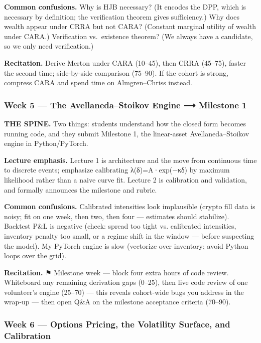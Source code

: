 \documentclass[
]{article}
\begin{document}
\textbf{Common confusions.} Why is HJB necessary? (It encodes the DPP,
which is necessary by definition; the verification theorem gives
sufficiency.) Why does wealth appear under CRRA but not CARA? (Constant
marginal utility of wealth under CARA.) Verification vs.~existence
theorem? (We always have a candidate, so we only need verification.)

\textbf{Recitation.} Derive Merton under CARA (10--45), then CRRA
(45--75), faster the second time; side-by-side comparison (75--90). If
the cohort is strong, compress CARA and spend time on Almgren--Chriss
instead.

\subsubsection{Week 5 --- The Avellaneda--Stoikov Engine ⟶ Milestone
1}\label{week-5-the-avellanedastoikov-engine-milestone-1}

\textbf{THE SPINE.} Two things: students understand how the closed form
becomes running code, and they submit Milestone 1, the linear-asset
Avellaneda--Stoikov engine in Python/PyTorch.

\textbf{Lecture emphasis.} Lecture 1 is architecture and the move from
continuous time to discrete events; emphasize calibrating
λ(δ)=A·exp(−κδ) by maximum likelihood rather than a naive curve fit.
Lecture 2 is calibration and validation, and formally announces the
milestone and rubric.

\textbf{Common confusions.} Calibrated intensities look implausible
(crypto fill data is noisy; fit on one week, then two, then four ---
estimates should stabilize). Backtest P\&L is negative (check: spread
too tight vs. calibrated intensities, inventory penalty too small, or a
regime shift in the window --- before suspecting the model). My PyTorch
engine is slow (vectorize over inventory; avoid Python loops over the
grid).

\textbf{Recitation.} ⚑ Milestone week --- block four extra hours of code
review. Whiteboard any remaining derivation gaps (0--25), then live code
review of one volunteer's engine (25--70) --- this reveals cohort-wide
bugs you address in the wrap-up --- then open Q\&A on the milestone
acceptance criteria (70--90).

\subsubsection{Week 6 --- Options Pricing, the Volatility Surface, and
Calibration}\label{week-6-options-pricing-the-volatility-surface-and-calibration}
\end{document}
